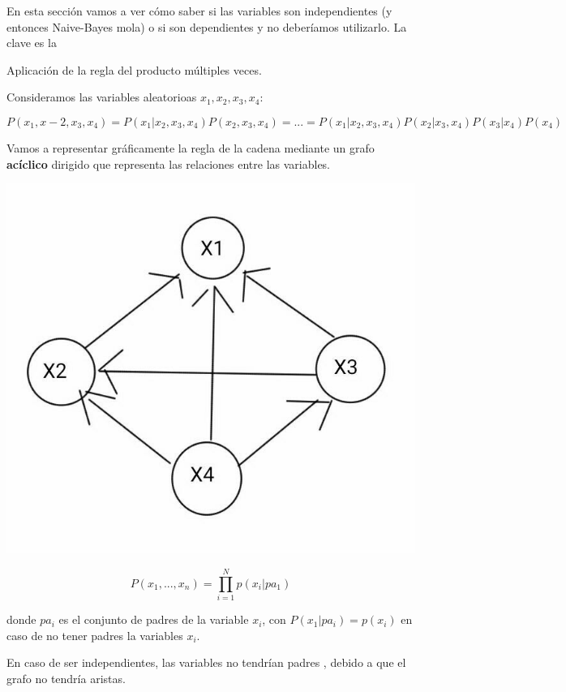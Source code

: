 \documentclass{apuntes}
\begin{document}
En esta sección vamos a ver cómo saber si las variables son independientes (y entonces Naive-Bayes mola) o si son dependientes y no deberíamos utilizarlo. La clave es la 

\begin{defn}
Aplicación de la regla del producto múltiples veces.
\end{defn}

Consideramos las variables aleatorioas $x_1,x_2,x_3,x_4$:

\[P(x_1,x-2,x_3,x_4) = P(x_1|x_2,x_3,x_4)P(x_2,x_3,x_4) = ... = P(x_1|x_2,x_3,x_4) P(x_2|x_3,x_4) P(x_3|x_4) P(x_4)\]


Vamos a representar gráficamente la regla de la cadena mediante un grafo \textbf{acíclico} dirigido que representa las relaciones entre las variables.

\includegraphics[scale=0.5]{img/grafo1.jpg}

\begin{defn}
\[P(x_1,...,x_n) = \prod_{i=1}^N p(x_i | pa_1)\]

donde $pa_i$ es el conjunto de padres de la variable $x_i$, con $P(x_1|pa_i) = p(x_i)$ en caso de no tener padres la variables $x_i$.

\end{defn}
\obs En caso de ser independientes, las variables no tendrían padres , debido a que el grafo no tendría aristas.
\end{document}
